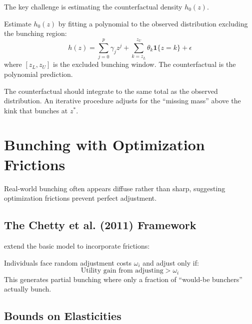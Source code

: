 The key challenge is estimating the counterfactual density $h_0(z)$.

\begin{definition}
\label{def:poly_counterfactual}
Estimate $h_0(z)$ by fitting a polynomial to the observed distribution excluding the bunching region:
\begin{equation}
    h(z) = \sum_{j=0}^{p} \gamma_j z^j + \sum_{k=z_L}^{z_U} \theta_k \mathbf{1}\{z = k\} + \epsilon
\end{equation}
where $[z_L, z_U]$ is the excluded bunching window. The counterfactual is the polynomial prediction.
\end{definition}

\begin{remark}
The counterfactual should integrate to the same total as the observed distribution. An iterative procedure adjusts for the ``missing mass'' above the kink that bunches at $z^*$.
\end{remark}

\section{Bunching with Optimization Frictions}
\label{sec:bunching_frictions}

Real-world bunching often appears diffuse rather than sharp, suggesting optimization frictions prevent perfect adjustment.

\subsection{The Chetty et al. (2011) Framework}

\citet{chetty2011adjustment} extend the basic model to incorporate frictions:

\begin{definition}
Individuals face random adjustment costs $\omega_i$ and adjust only if:
\begin{equation}
    \text{Utility gain from adjusting} > \omega_i
\end{equation}
This generates partial bunching where only a fraction of ``would-be bunchers'' actually bunch.
\end{definition}

\subsection{Bounds on Elasticities}

